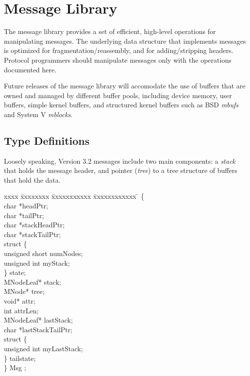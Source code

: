 % 
%
%

\section{Message Library}

The message library provides a set of efficient, high-level operations
for manipulating messages.  The underlying data structure that
implements messages is optimized for fragmentation/reassembly, and for
adding/stripping headers. 
Protocol
programmers should manipulate messages only with the operations
documented here.

Future releases of the message library will accomodate
the use of buffers that
are owned and managed by different buffer pools, including device
memory, user buffers, simple kernel buffers, and structured kernel
buffers such as BSD {\em mbufs} and System V {\em mblocks}.  

\subsection{Type Definitions}

Loosely speaking, Version 3.2 messages include two main components: a
{\it stack} that holds the message header, and pointer ({\it tree}) to
a tree structure of buffers that hold the data. 


\begin{tabbing}
xxxx \= xxxxxxxx \= xxxxxxxxxxx \= xxxxxxxxxxxx \= \kill
{} \{\\
\>\>  {\sem char}       \>*headPtr;\\
\>\>  {\sem char}       \>*tailPtr;\\
\>\>  {\sem char}       \>*stackHeadPtr;\\
\>\>  {\sem char}       \>*stackTailPtr;\\
\>\>  {\sem struct} \{\\
\>\>\>    {\sem unsigned short} \> numNodes;\\
\>\>\>    {\sem unsigned int}   \> myStack;\\
\>\>  \} state;\\
\>\>  {\sem MNodeLeaf}* \>stack;\\
\>\>  {\sem MNode}*     \>tree;\\
\>\>  {\sem void}*	\>attr;\\
\>\>  {\sem int}	\>attrLen;\\
\>\>  {\sem MNodeLeaf}* \>lastStack;\\
\>\>  {\sem char}       \>*lastStackTailPtr;\\
\>\>  {\sem struct} \{\\
\>\>\>    {\sem unsigned int}   \> myLastStack;\\
\>\>  \} tailstate;\\
\>\} {\bold Msg} ;
\end{tabbing}

